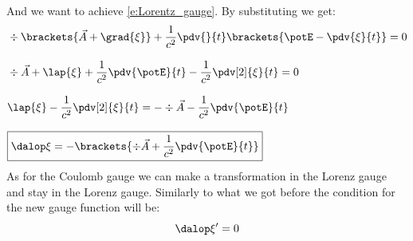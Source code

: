 And we want to achieve \eqref{e:Lorentz_gauge}. By substituting we get:
\begin{equation}
  \begin{split}
    &\div{\brackets{\vec{A} + \grad{\xi}}} + \dfrac{1}{c^2} \pdv{}{t}\brackets{\potE - \pdv{\xi}{t}} = 0 \\[8pt]
    &\div{\vec{A}} + \lap{\xi} + \dfrac{1}{c^2} \pdv{\potE}{t} - \dfrac{1}{c^2} \pdv[2]{\xi}{t} = 0 \\[8pt]
    &\lap{\xi} - \dfrac{1}{c^2} \pdv[2]{\xi}{t} = -\div{\vec{A}} - \dfrac{1}{c^2} \pdv{\potE}{t} \\[8pt]
    &\boxed{\dalop \xi = -\brackets{\div{\vec{A}} + \dfrac{1}{c^2} \pdv{\potE}{t}}}
  \end{split}
\end{equation}
As for the Coulomb gauge we can make a transformation in the Lorenz gauge and stay in the Lorenz gauge. Similarly to what we got before the condition for the new gauge function will be:
\begin{equation}
  \dalop \xi' = 0
\end{equation}
